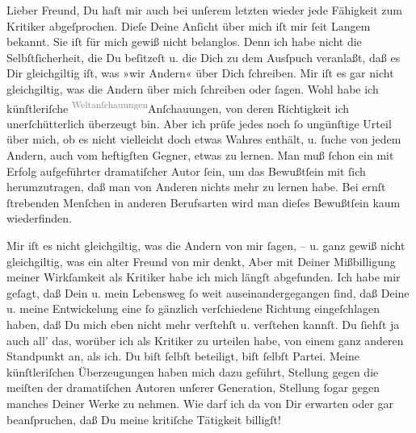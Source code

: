 \pstart
           Lieber Freund, Du haſt mir auch bei unſerem letzten \label{K_L03475-10v}\label{K_L03475-10h} wieder jede Fähigkeit zum Kritiker abgeſprochen. Dieſe Deine
               Anſicht über mich iſt mir ſeit Langem bekannt. Sie iſt für mich gewiß nicht
               belanglos. Denn ich habe nicht die Selbſtſicherheit, die Du beſitzeſt u. die Dich zu
               dem Ausſpuch veranlaßt, daß es {\pb}Dir gleichgiltig
               iſt, was  »wir Andern« über Dich ſchreiben. Mir
               iſt es gar nicht gleichgiltig, was die Andern über mich ſchreiben oder ſagen. Wohl
               habe ich künſtleriſche \substVorne{}\textsuperscript{\textcolor{gray}{Weltanſchauungen}}{\allowbreak}\substDazwischen{}Anſchauungen\substHinten{}, von deren Richtigkeit ich unerſchütterlich überzeugt bin. Aber ich prüfe
               jedes noch ſo ungünſtige Urteil über mich, ob es nicht vielleicht doch etwas Wahres
               enthält, u. ſuche von jedem Andern, auch vom heftigſten Gegner, etwas zu lernen. Man
               muß ſchon ein mit Erfolg aufgeführter dramatiſcher Autor ſein, {\pb}um das Bewußtſein mit ſich herumzutragen, daß
               man von Anderen nichts mehr zu lernen habe. Bei ernſt ſtrebenden Menſchen in anderen
               Berufsarten wird man dieſes Bewußtſein kaum wiederfinden.\pend
           
\pstart
           Mir iſt es nicht gleichgiltig, was die Andern von mir ſagen, – u. ganz gewiß nicht
               gleichgiltig, was ein alter Freund von mir denkt, Aber mit Deiner Mißbilligung meiner
               Wirkſamkeit als Kritiker habe ich mich \introOben{}längſt\introOben{} abgefunden.
               Ich habe mir geſagt, daß Dein u. mein Lebensweg ſo
               weit auseinandergegangen ſind, {\pb}daß Deine u. meine
               Entwickelung eine ſo gänzlich verſchiedene Richtung eingeſchlagen haben, daß Du mich
               eben nicht mehr verſtehſt u. verſtehen kannſt. Du ſiehſt ja auch all’ das, worüber
               ich als Kritiker zu urteilen habe, von einem ganz anderen Standpunkt an, als ich. Du
               biſt ſelbſt beteiligt, biſt ſelbſt Partei. Meine künſtleriſchen Überzeugungen haben
               mich dazu geführt, Stellung gegen  die meiſten der dramatiſchen Autoren unſerer Generation, Stellung ſogar gegen
               manches Deiner Werke zu nehmen. {\pb}Wie darf ich da
               von Dir erwarten oder gar beanſpruchen, daß Du meine kritiſche Tätigkeit
               billigſt!\pend
           
